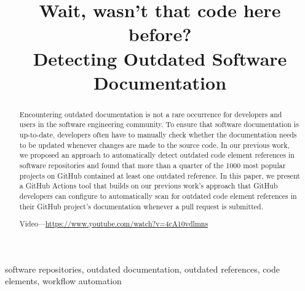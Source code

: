 \documentclass[conference]{IEEEtran}
\begin{document}
\title{Wait, wasn't that code here before?\\Detecting Outdated Software Documentation}

\author{
\and
{}
\and
{}
}

\maketitle

\begin{abstract}
Encountering outdated documentation is not a rare occurrence for developers and users in the software engineering community. To ensure that software documentation is up-to-date, developers often have to manually check whether the documentation needs to be updated whenever changes are made to the source code. In our previous work, we proposed an approach to automatically detect outdated code element references in software repositories and found that more than a quarter of the 1000 most popular projects on GitHub contained at least one outdated reference. In this paper, we present a GitHub Actions tool that builds on our previous work's approach that GitHub developers can configure to automatically scan for outdated code element references in their GitHub project's documentation whenever a pull request is submitted.

Video—\url{https://www.youtube.com/watch?v=4cA10vdlmns}
\end{abstract}

\begin{IEEEkeywords}
software repositories, outdated documentation, outdated references, code elements, workflow automation
\end{IEEEkeywords}
\end{document}
